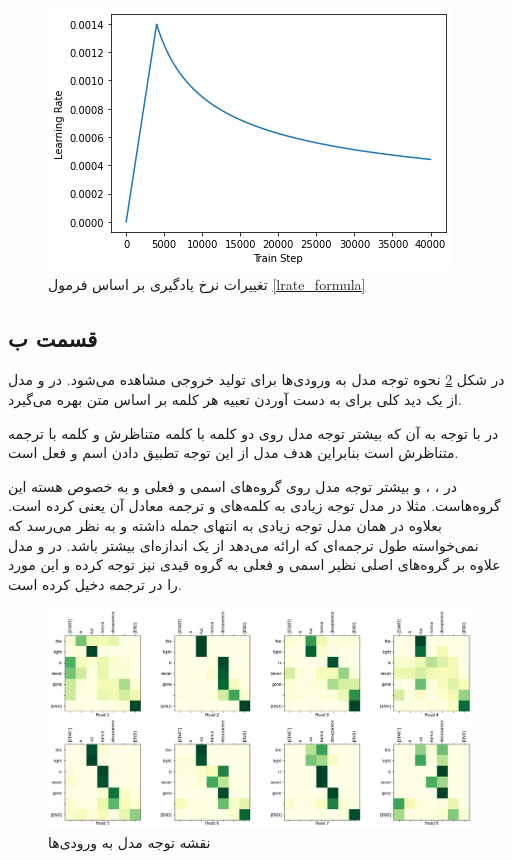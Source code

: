 \documentclass[12pt, a4paper]{book}
\begin{document}
\begin{figure}[h]
    \centering
    \includegraphics[width=0.5\linewidth]{images/lrate_fig.png}
    \caption{تغییرات نرخ یادگیری بر اساس فرمول \ref{lrate_formula}}
    \label{lrate_figure}
\end{figure}

\subsection*{قسمت ب}

در شکل \ref{attention} نحوه توجه مدل به ورودی‌ها برای تولید خروجی مشاهده می‌شود.
در  و  مدل از یک دید کلی برای به دست آوردن تعبیه هر کلمه بر اساس متن بهره می‌گیرد.

در  با توجه به آن که بیشتر توجه مدل روی دو کلمه  با کلمه متناظرش و کلمه  با
ترجمه متناظرش است بنابراین هدف مدل از این توجه تطبیق دادن اسم و فعل است.

در ، ،  و  بیشتر توجه مدل روی گروه‌های اسمی و فعلی و به خصوص
هسته این گروه‌هاست. مثلا در  مدل توجه زیادی به کلمه‌های  و ترجمه معادل آن
یعنی  کرده است. بعلاوه در همان  مدل توجه زیادی به انتهای جمله داشته و
به نظر می‌رسد که نمی‌خواسته طول ترجمه‌ای که ارائه می‌دهد از یک اندازه‌ای بیشتر باشد. در  و  مدل علاوه بر
گروه‌های اصلی نظیر اسمی و فعلی به گروه قیدی  نیز توجه کرده و این مورد را در ترجمه دخیل کرده است.

\begin{figure}[h]
    \centering
    \includegraphics[width=\linewidth]{images/attention.png}
    \caption{نقشه توجه مدل به ورودی‌ها}
    \label{attention}
\end{figure}
\end{document}
